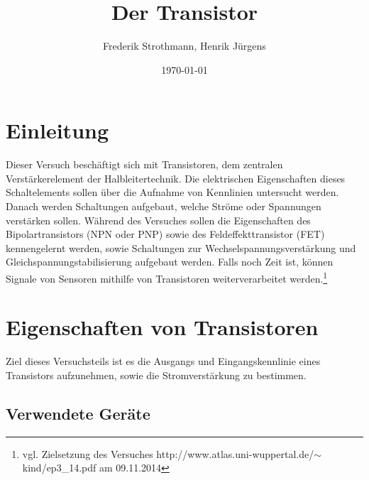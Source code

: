 \documentclass[12pt,a4paper]{article}
\title{Der Transistor}
\author{Frederik Strothmann, Henrik Jürgens}
\date{\today}
\begin{document}
\maketitle
\newpage
\tableofcontents
\newpage
\section{Einleitung}
Dieser Versuch beschäftigt sich mit Transistoren, dem zentralen Verstärkerelement der Halbleitertechnik. Die elektrischen Eigenschaften dieses Schaltelements sollen über die Aufnahme von Kennlinien untersucht werden. Danach werden Schaltungen aufgebaut, welche Ströme oder Spannungen verstärken sollen. Während des Versuches sollen die Eigenschaften des Bipolartransistors (NPN oder PNP) sowie des Feldeffekttransistor (FET) kennengelernt werden, sowie Schaltungen zur Wechselspannungsverstärkung und Gleichspannungstabilisierung aufgebaut werden. Falls noch Zeit ist, können Signale von Sensoren mithilfe von Transistoren weiterverarbeitet werden.\footnote{vgl. Zielsetzung des Versuches http://www.atlas.uni-wuppertal.de/$\sim$kind/ep3\_14.pdf am 09.11.2014}
\section{Eigenschaften von Transistoren}
Ziel dieses Versuchsteils ist es die Ausgangs und Eingangskennlinie eines Transistors aufzunehmen, sowie die Stromverstärkung zu bestimmen.
\subsection{Verwendete Geräte}

\end{document}
